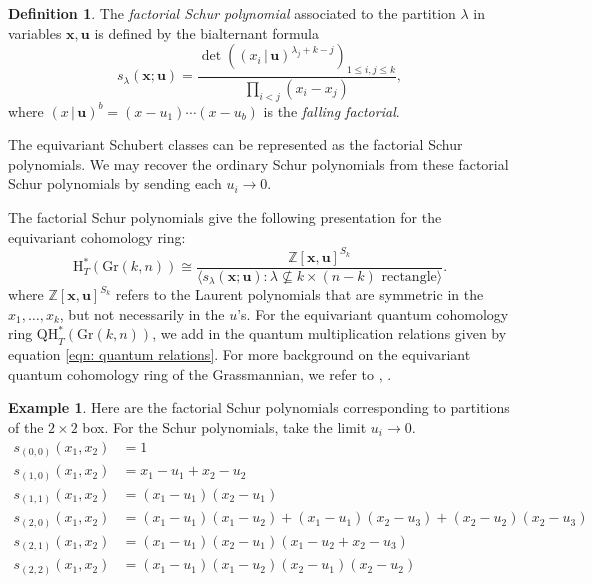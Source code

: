 \documentclass[12pt]{article}
\newcommand{\bb}[1]{\mathbb{#1}}
\theoremstyle{plain}
\theoremstyle{definition}
\newtheorem{definition}[theorem]{Definition}
\newtheorem{example}[theorem]{Example}
\newcommand{\xb}{\boldsymbol{x}}
\newcommand{\ub}{\boldsymbol{u}}
\begin{document}
\begin{definition}
The \textit{factorial Schur polynomial} associated to the partition $\lambda$ in variables $\xb ,\ub$ is defined by the bialternant formula
\begin{equation} \label{factschur}
s_\lambda(\xb ;\ub) = \frac{\det\left( (x_i\, | \,\ub)^{\lambda_j+k-j} \right)_{1 \leq i, j \leq k}}{\prod_{i<j} (x_i-x_j)},
\end{equation}
where $ (x \,|\, \ub)^{b} =(x-u_1)\cdots (x-u_b)$ is the \emph{falling factorial}. 
\end{definition}

The equivariant Schubert classes can be represented as the factorial Schur polynomials. We may recover the ordinary Schur polynomials from these factorial Schur polynomials by sending each $u_i \to 0$.

The factorial Schur polynomials give the following presentation for the equivariant cohomology ring:
\begin{equation}
    \textrm{H}^*_T(\textrm{Gr}(k,n)) \cong \frac{\bb{Z}[\xb, \ub]^{S_k}}{\langle s_\lambda(\xb ;\ub) : \lambda \not \subseteq k \times (n-k) \text{ rectangle} \rangle}.
\end{equation}
where $\bb{Z}[\xb, \ub] ^{S_k}$ refers to the Laurent polynomials that are symmetric in the $x_1,\dots,x_k$, but not necessarily in the $u$'s.
For the equivariant quantum cohomology ring $\mathrm{QH}^*_T (\mathrm{Gr}(k,n))$, we add in the quantum multiplication relations given by equation \ref{eqn: quantum relations}. For more background on the equivariant quantum cohomology ring of the Grassmannian, we refer to \cite{buch2001quantumcohomologygrassmannians}, \cite{mihalcea2004equivariantquantumschubertcalculus}. 

\begin{example}
    Here are the factorial Schur polynomials corresponding to partitions of the $2\times 2$ box. For the Schur polynomials, take the limit $u_i \to 0$.
    \begin{align*}
        s_{(0,0)}(x_1,x_2) &= 1\\
        s_{(1,0)}(x_1,x_2) &= x_1-u_1+x_2-u_2\\
        s_{(1,1)}(x_1,x_2) &= (x_1-u_1)(x_2-u_1)\\
        s_{(2,0)}(x_1,x_2) &= \left( x_{{1}}-u_{{1}} \right)  \left( x_{{1}}-u_{{2}} \right) +
 \left( x_{{1}}-u_{{1}} \right)  \left( x_{{2}}-u_{{3}} \right) +
 \left( x_{{2}}-u_{{2}} \right)  \left( x_{{2}}-u_{{3}} \right) 
\\
        s_{(2,1)}(x_1,x_2) &= (x_1-u_1)(x_2-u_1)(x_1-u_2+x_2-u_3)\\
        s_{(2,2)}(x_1,x_2) &= (x_1-u_1)(x_1-u_2)(x_2-u_1)(x_2-u_2)\\
    \end{align*}
\end{example}
\end{document}
